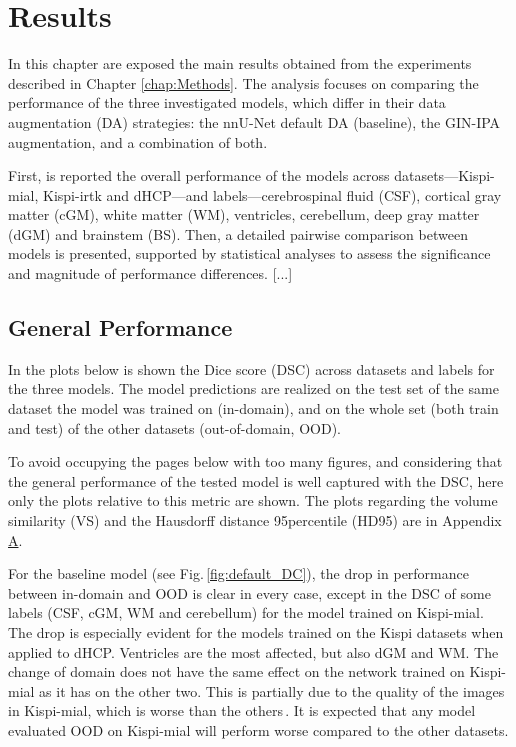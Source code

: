 \chapter{Results} \label{chap:Results}
\vspace{1cm}

In this chapter are exposed the main results obtained from the experiments described in Chapter \ref{chap:Methods}. The analysis focuses on comparing the performance of the three investigated models, which differ in their data augmentation (DA) strategies: the nnU-Net default DA (baseline), the GIN-IPA augmentation, and a combination of both.

First, is reported the overall performance of the models across datasets---Kispi-mial, Kispi-irtk and dHCP---and labels---cerebrospinal fluid (CSF), cortical gray matter (cGM), white matter (WM), ventricles, cerebellum, deep gray matter (dGM) and brainstem (BS). Then, a detailed pairwise comparison between models is presented, supported by statistical analyses to assess the significance and magnitude of performance differences. [...]

\section{General Performance} \label{sec:GeneralPerformance}
In the plots below is shown the Dice score (DSC) across datasets and labels for the three models. The model predictions are realized on the test set of the same dataset the model was trained on (in-domain), and on the whole set (both train and test) of the other datasets (out-of-domain, OOD).

To avoid occupying the pages below with too many figures, and considering that the general performance of the tested model is well captured with the DSC, here only the plots relative to this metric are shown. The plots regarding the volume similarity (VS) and the Hausdorff distance 95\th percentile (HD95) are in Appendix \hyperref[app:SupplementaryPlots]{A}.

For the baseline model (see Fig.\,\ref{fig:default_DC}), the drop in performance between in-domain and OOD is clear in every case, except in the DSC of some labels (CSF, cGM, WM and cerebellum) for the model trained on Kispi-mial. The drop is especially evident for the models trained on the Kispi datasets when applied to dHCP. Ventricles are the most affected, but also dGM and WM. The change of domain does not have the same effect on the network trained on Kispi-mial as it has on the other two. This is partially due to the quality of the images in Kispi-mial, which is worse than the others\,\cite{FeTA2022_review}. It is expected that any model evaluated OOD on Kispi-mial will perform worse compared to the other datasets.

